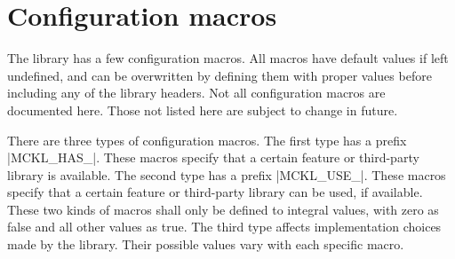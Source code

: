 %
%
%
%

\chapter{Configuration macros}
\label{chap:Configuration macros}

The library has a few configuration macros. All macros have default values if
left undefined, and can be overwritten by defining them with proper values
before including any of the library headers. Not all configuration macros are
documented here. Those not listed here are subject to change in future.

There are three types of configuration macros. The first type has a prefix
|MCKL_HAS_|. These macros specify that a certain feature or third-party library
is available. The second type has a prefix |MCKL_USE_|. These macros specify
that a certain feature or third-party library can be used, if available. These
two kinds of macros shall only be defined to integral values, with zero as
false and all other values as true. The third type affects implementation
choices made by the library. Their possible values vary with each specific
macro.

